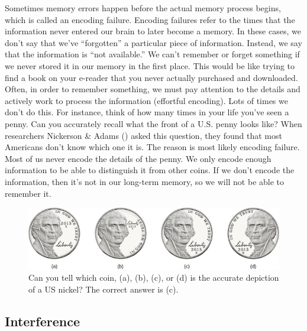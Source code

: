 \documentclass[
]{krantz}
\begin{document}
Sometimes memory errors happen before the actual memory process begins, which is called an encoding failure. Encoding failures refer to the times that the information never entered our brain to later become a memory. In these cases, we don't say that we've ``forgotten'' a particular piece of information. Instead, we say that the information is ``not available.'' We can't remember or forget something if we never stored it in our memory in the first place. This would be like trying to find a book on your e-reader that you never actually purchased and downloaded. Often, in order to remember something, we must pay attention to the details and actively work to process the information (effortful encoding). Lots of times we don't do this. For instance, think of how many times in your life you've seen a penny. Can you accurately recall what the front of a U.S. penny looks like? When researchers Nickerson \& Adams () asked this question, they found that most Americans don't know which one it is. The reason is most likely encoding failure. Most of us never encode the details of the penny. We only encode enough information to be able to distinguish it from other coins. If we don't encode the information, then it's not in our long-term memory, so we will not be able to remember it.

\begin{figure}

{\centering \includegraphics[width=0.8\linewidth]{images/ch6/fig3} 

}

\caption{Can you tell which coin, (a), (b), (c), or (d) is the accurate depiction of a US nickel? The correct answer is (c).}\label{fig:nickel}
\end{figure}

\subsection*{Interference}\label{interference}
\end{document}
